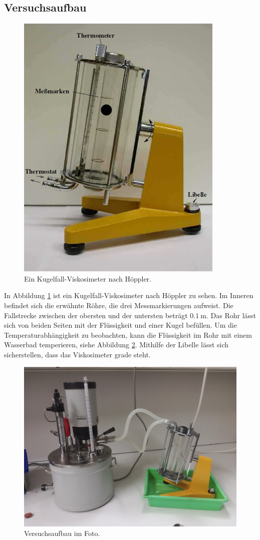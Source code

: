 \subsection{Versuchsaufbau}
\begin{figure}
  \centering
  \includegraphics[scale=0.4]{visko.png}
  \caption{Ein Kugelfall-Viskosimeter nach Höppler.}
  \label{fig:1}
\end{figure}
In Abbildung \ref{fig:1} ist ein Kugelfall-Viskosimeter nach Höppler zu sehen.
Im Inneren befindet sich die erwähnte Röhre, die drei Messmarkierungen aufweist.
Die Fallstrecke zwischen der obersten und der untersten beträgt $\SI{0.1}{\meter}$.
Das Rohr lässt sich von beiden Seiten mit der Flüssigkeit und einer Kugel befüllen.
Um die Temperaturabhängigkeit zu beobachten, kann die Flüssigkeit im Rohr mit einem Wasserbad
temperieren, siehe Abbildung \ref{fig:2}. Mithilfe der Libelle lässt sich sicherstellen,
dass das Viskosimeter grade steht.
\begin{figure}
  \centering
  \includegraphics[scale=0.05]{aufbau.jpg}
  \caption{Versuchsaufbau im Foto.}
  \label{fig:2}
\end{figure}
